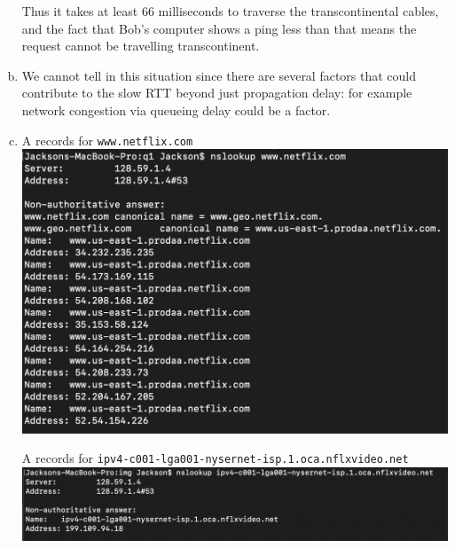 \documentclass[11pt]{article}
\begin{document}
\begin{enumerate}[(a)]
      Thus it takes at least 66 milliseconds to traverse the transcontinental
      cables, and the fact that Bob's computer shows a ping less than that means
      the request cannot be travelling transcontinent.
    \item
      We cannot tell in this situation since there are several factors that could
      contribute to the slow RTT beyond just propagation delay: for example network
      congestion via queueing delay could be a factor.
    \item
      A records for \texttt{www.netflix.com} \\
      \includegraphics[width=15cm]{1}

      A records for \texttt{ipv4-c001-lga001-nysernet-isp.1.oca.nflxvideo.net } \\
      \includegraphics[width=15cm]{2}


\end{enumerate}
\end{document}
